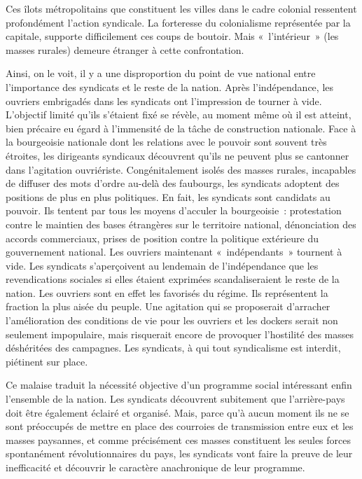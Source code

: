 \documentclass[french,twoside]{book} %
\begin{document}
Ces îlots métropolitains que constituent les villes dans le cadre colonial ressentent profondément l’action syndicale. La forteresse du colonialisme représentée par la capitale, supporte difficilement ces coups de boutoir. Mais « l’intérieur » (les masses rurales) demeure étranger à cette confrontation.\par
Ainsi, on le voit, il y a une disproportion du point de vue national entre l’importance des syndicats et le reste de la nation. Après l’indépendance, les ouvriers embrigadés dans les syndicats ont l’impression de tourner à vide. L’objectif limité qu’ils s’étaient fixé se révèle, au moment même où il est atteint, bien précaire eu égard à l’immensité de la tâche de construction nationale. Face à la bourgeoisie nationale dont les relations avec le pouvoir sont souvent très étroites, les dirigeants syndicaux découvrent qu’ils ne peuvent plus se cantonner dans l’agitation ouvriériste. Congénitalement isolés des masses rurales, incapables de diffuser des mots d’ordre au-delà des faubourgs, les syndicats adoptent des positions de plus en plus politiques. En fait, les syndicats sont candidats au pouvoir. Ils tentent par tous les moyens d’acculer la bourgeoisie : protestation contre le maintien des bases étrangères sur le territoire national, dénonciation   des accords commerciaux, prises de position contre la politique extérieure du gouvernement national. Les ouvriers maintenant « indépendants » tournent à vide. Les syndicats s’aperçoivent au lendemain de l’indépendance que les revendications sociales si elles étaient exprimées scandaliseraient le reste de la nation. Les ouvriers sont en effet les favorisés du régime. Ils représentent la fraction la plus aisée du peuple. Une agitation qui se proposerait d’arracher l’amélioration des conditions de vie pour les ouvriers et les dockers serait non seulement impopulaire, mais risquerait encore de provoquer l’hostilité des masses déshéritées des campagnes. Les syndicats, à qui tout syndicalisme est interdit, piétinent sur place.\par
Ce malaise traduit la nécessité objective d’un programme social intéressant enfin l’ensemble de la nation. Les syndicats découvrent subitement que l’arrière-pays doit être également éclairé et organisé. Mais, parce qu’à aucun moment ils ne se sont préoccupés de mettre en place des courroies de transmission entre eux et les masses paysannes, et comme précisément ces masses constituent les seules forces spontanément révolutionnaires du pays, les syndicats vont faire la preuve de leur inefficacité et découvrir le caractère anachronique de leur programme.\par
\end{document}
